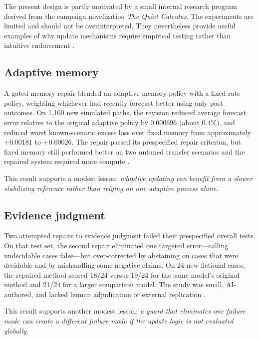 \documentclass[11pt]{article}
\begin{document}
The present design is partly motivated by a small internal research program derived from the campaign novelization \emph{The Quiet Calculus}. The experiments are limited and should not be overinterpreted. They nevertheless provide useful examples of why update mechanisms require empirical testing rather than intuitive endorsement \cite{quietcalculus2026}.

\subsection{Adaptive memory}

A gated memory repair blended an adaptive memory policy with a fixed-rate policy, weighting whichever had recently forecast better using only past outcomes. On 1,100 new simulated paths, the revision reduced average forecast error relative to the original adaptive policy by $0.000696$ (about $0.4\%$), and reduced worst known-scenario excess loss over fixed memory from approximately $+0.00181$ to $+0.00026$. The repair passed its prespecified repair criterion, but fixed memory still performed better on two untuned transfer scenarios and the repaired system required more compute \cite{quietcalculus2026}.

This result supports a modest lesson: \emph{adaptive updating can benefit from a slower stabilizing reference rather than relying on one adaptive process alone}.

\subsection{Evidence judgment}

Two attempted repairs to evidence judgment failed their prespecified overall tests. On that test set, the second repair eliminated one targeted error---calling undecidable cases false---but over-corrected by abstaining on cases that were decidable and by mishandling some negative claims. On 24 new fictional cases, the repaired method scored 18/24 versus 19/24 for the same model's original method and 21/24 for a larger comparison model. The study was small, AI-authored, and lacked human adjudication or external replication \cite{quietcalculus2026}.

This result supports another modest lesson: \emph{a guard that eliminates one failure mode can create a different failure mode if the update logic is not evaluated globally}.
\end{document}

